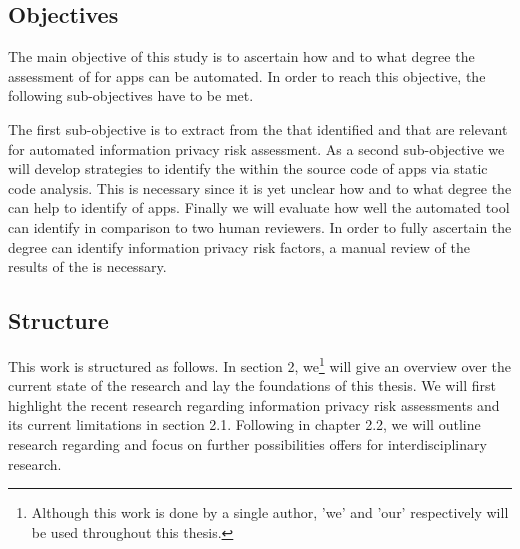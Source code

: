 \subsection{Objectives}

The main objective of this study is to ascertain how and to what degree the assessment of \iprfs for \mH apps can be automated.
In order to reach this objective, the following sub-objectives have to be met.

The first sub-objective is to extract \iprfs from the \ipp that \cite{Dehling2016} identified and that are relevant for automated information privacy risk assessment.
As a second sub-objective we will develop strategies to identify the \iprfs within the source code of \mH apps via static code analysis.
This is necessary since it is yet unclear how and to what degree the \sca can help to identify \iprfs of \mH apps. 
Finally we will evaluate how well the automated \pra tool can identify \iprfs in comparison to two human reviewers.
In order to fully ascertain the degree \sca can identify information privacy risk factors, a manual review of the results of the \sca is necessary.

\subsection{Structure}

This work is structured as follows. 
In section 2, we\footnote{Although this work is done by a single author, 'we' and 'our' respectively will be used throughout this thesis.} will give an overview over the current state of the research and lay the foundations of this thesis.
We will first highlight the recent research regarding information privacy risk assessments and its current limitations in section 2.1.
Following in chapter 2.2, we will outline research regarding \sca and focus on further possibilities \sca offers for interdisciplinary research.